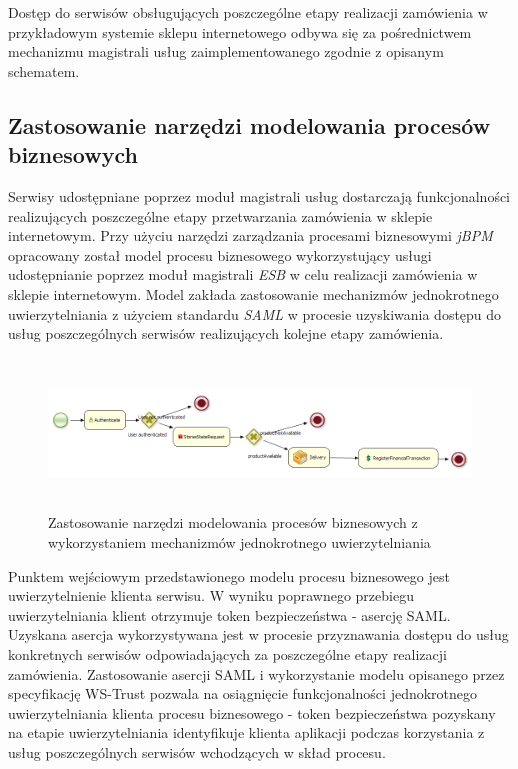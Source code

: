 	Dostęp do serwisów obsługujących poszczególne etapy realizacji zamówienia w przykładowym systemie sklepu internetowego odbywa się za pośrednictwem mechanizmu magistrali usług zaimplementowanego zgodnie z opisanym schematem. 
	
	\subsection{Zastosowanie narzędzi modelowania procesów biznesowych}

	Serwisy udostępniane poprzez moduł magistrali usług dostarczają funkcjonalności realizujących poszczególne etapy przetwarzania zamówienia w sklepie internetowym. Przy użyciu narzędzi zarządzania procesami biznesowymi \textit{jBPM} opracowany został model procesu biznesowego wykorzystujący usługi udostępnianie poprzez moduł magistrali \textit{ESB} w celu realizacji zamówienia w sklepie internetowym. Model zakłada zastosowanie mechanizmów jednokrotnego uwierzytelniania z użyciem standardu \textit{SAML} w procesie uzyskiwania dostępu do usług poszczególnych serwisów realizujących kolejne etapy zamówienia. 

		\begin{figure}[!htb]
			\centering
			\includegraphics[width=18cm,height=4cm]{img/jbpm_order_process.png}
			\caption{Zastosowanie narzędzi modelowania procesów biznesowych z wykorzystaniem mechanizmów jednokrotnego uwierzytelniania}
			\label{jBPM process}
		\end{figure}

	Punktem wejściowym przedstawionego modelu procesu biznesowego jest uwierzytelnienie klienta serwisu. W wyniku poprawnego przebiegu uwierzytelniania klient otrzymuje token bezpieczeństwa - asercję SAML. Uzyskana asercja wykorzystywana jest w procesie przyznawania dostępu do usług konkretnych serwisów odpowiadających za poszczególne etapy realizacji zamówienia. Zastosowanie asercji SAML i wykorzystanie modelu opisanego przez specyfikację WS-Trust pozwala na osiągnięcie funkcjonalności jednokrotnego uwierzytelniania klienta procesu biznesowego - token bezpieczeństwa pozyskany na etapie uwierzytelniania identyfikuje klienta aplikacji podczas korzystania z usług poszczególnych serwisów wchodzących w skład procesu.


